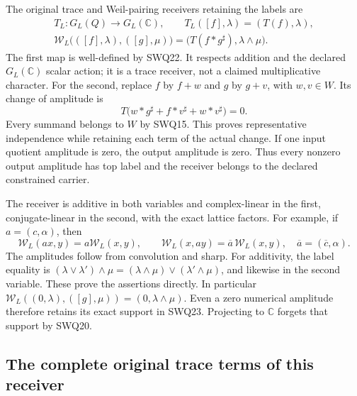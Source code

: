 \documentclass[11pt]{article}
\begin{document}
The original trace and Weil-pairing receivers retaining the labels are
\begin{equation}\tag{SWQ23}
\begin{gathered}
 T_L:G_L(Q)\longrightarrow G_L(\mathbb C),\qquad
 T_L([f],\lambda)=(T(f),\lambda),\\
 \mathcal W_L\bigl(([f],\lambda),([g],\mu)\bigr)
   =\bigl(T(f*g^{\sharp}),\lambda\wedge\mu\bigr).
\end{gathered}
\end{equation}
The first map is well-defined by SWQ22. It respects addition and
the declared $G_L(\mathbb C)$ scalar action; it is a trace receiver,
not a claimed multiplicative character. For the second, replace
$f$ by $f+w$ and $g$ by $g+v$, with $w,v\in W$. Its change of
amplitude is
\begin{equation}\tag{SWQ24}
 T\bigl(w*g^{\sharp}+f*v^{\sharp}+w*v^{\sharp}\bigr)=0.
\end{equation}
Every summand belongs to $W$ by SWQ15. This proves representative
independence while retaining each term of the actual change.
If one input quotient amplitude is zero, the output amplitude is
zero. Thus every nonzero output amplitude has top label and the
receiver belongs to the declared constrained carrier.

The receiver is additive in both variables and complex-linear in
the first, conjugate-linear in the second, with the exact lattice
factors. For example, if $a=(c,\alpha)$, then
\begin{equation}\tag{SWQ25}
 \mathcal W_L(ax,y)=a\mathcal W_L(x,y),\qquad
 \mathcal W_L(x,ay)=\overline a\,\mathcal W_L(x,y),
 \quad\overline a=(\overline c,\alpha).
\end{equation}
The amplitudes follow from convolution and sharp. For additivity,
the label equality is
$(\lambda\vee\lambda')\wedge\mu
=(\lambda\wedge\mu)\vee(\lambda'\wedge\mu)$, and likewise in
the second variable. These prove the assertions directly.
In particular
$\mathcal W_L((0,\lambda),([g],\mu))=(0,\lambda\wedge\mu)$.
Even a zero numerical amplitude therefore retains its exact support
in SWQ23. Projecting to $\mathbb C$ forgets that support by SWQ20.

\subsection{The complete original trace terms of this receiver}
\end{document}

